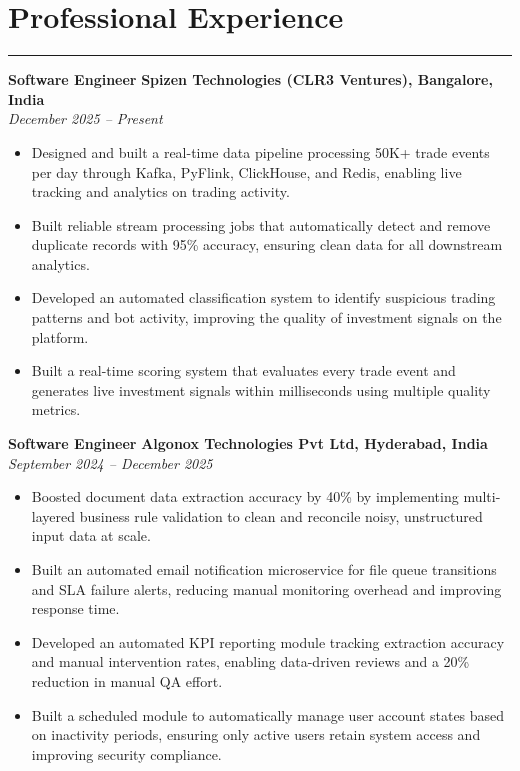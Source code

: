 \documentclass[10pt]{article}
\begin{document}
\section*{Professional Experience}
\vspace{1pt}\hrule\vspace{4pt}

\textbf{Software Engineer} \hfill \textbf{Spizen Technologies (CLR3 Ventures), Bangalore, India} \\
\textit{December 2025 -- Present}
\begin{itemize}
  \item Designed and built a real-time data pipeline processing 50K+ trade events per day through Kafka, PyFlink, ClickHouse, and Redis, enabling live tracking and analytics on trading activity.
  \item Built reliable stream processing jobs that automatically detect and remove duplicate records with 95\% accuracy, ensuring clean data for all downstream analytics.
  \item Developed an automated classification system to identify suspicious trading patterns and bot activity, improving the quality of investment signals on the platform.
  \item Built a real-time scoring system that evaluates every trade event and generates live investment signals within milliseconds using multiple quality metrics.
\end{itemize}

\textbf{Software Engineer} \hfill \textbf{Algonox Technologies Pvt Ltd, Hyderabad, India} \\
\textit{September 2024 -- December 2025}
\begin{itemize}
  \item Boosted document data extraction accuracy by 40\% by implementing multi-layered business rule validation to clean and reconcile noisy, unstructured input data at scale.
  \item Built an automated email notification microservice for file queue transitions and SLA failure alerts, reducing manual monitoring overhead and improving response time.
  \item Developed an automated KPI reporting module tracking extraction accuracy and manual intervention rates, enabling data-driven reviews and a 20\% reduction in manual QA effort.
  \item Built a scheduled module to automatically manage user account states based on inactivity periods, ensuring only active users retain system access and improving security compliance.
\end{itemize}
\end{document}
